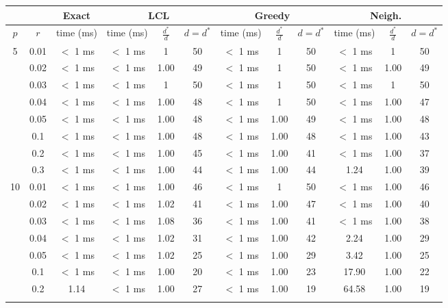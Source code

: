 \begin{tabular}{| c | c | c | c | c | c | c | c | c |  c | c | c | }
	\hline
	& & Exact & \multicolumn{3}{c|}{LCL} & \multicolumn{3}{c|}{Greedy} & \multicolumn{3}{c|}{Neigh.} \\
	\hline
	$p$ & $r$ & time (ms) & time (ms) & $\frac{d^*}{d}$ & $d = d^*$ & time (ms) &  $\frac{d^*}{d}$ & $d = d^*$ & time (ms) &  $\frac{d^*}{d}$ & $d = d^*$ \\
	\hline
	\multirow{8}{*}{5} & 0.01 & $<$ 1 ms & $<$ 1 ms & 1 & 50 & $<$ 1 ms & 1 & 50 & $<$ 1 ms & 1 & 50\\
	\cline{2-12}
	& 0.02 & $<$ 1 ms & $<$ 1 ms & 1.00 & 49 & $<$ 1 ms & 1 & 50 & $<$ 1 ms & 1.00 & 49\\
	\cline{2-12}
	& 0.03 & $<$ 1 ms & $<$ 1 ms & 1 & 50 & $<$ 1 ms & 1 & 50 & $<$ 1 ms & 1 & 50\\
	\cline{2-12}
	& 0.04 & $<$ 1 ms & $<$ 1 ms & 1.00 & 48 & $<$ 1 ms & 1 & 50 & $<$ 1 ms & 1.00 & 47\\
	\cline{2-12}
	& 0.05 & $<$ 1 ms & $<$ 1 ms & 1.00 & 48 & $<$ 1 ms & 1.00 & 49 & $<$ 1 ms & 1.00 & 48\\
	\cline{2-12}
	& 0.1 & $<$ 1 ms & $<$ 1 ms & 1.00 & 48 & $<$ 1 ms & 1.00 & 48 & $<$ 1 ms & 1.00 & 43\\
	\cline{2-12}
	& 0.2 & $<$ 1 ms & $<$ 1 ms & 1.00 & 45 & $<$ 1 ms & 1.00 & 41 & $<$ 1 ms & 1.00 & 37\\
	\cline{2-12}
	& 0.3 & $<$ 1 ms & $<$ 1 ms & 1.00 & 44 & $<$ 1 ms & 1.00 & 44 & 1.24 & 1.00 & 39\\
	\hline
	\multirow{8}{*}{10} & 0.01 & $<$ 1 ms & $<$ 1 ms & 1.00 & 46 & $<$ 1 ms & 1 & 50 & $<$ 1 ms & 1.00 & 46\\
	\cline{2-12}
	& 0.02 & $<$ 1 ms & $<$ 1 ms & 1.02 & 41 & $<$ 1 ms & 1.00 & 47 & $<$ 1 ms & 1.00 & 40\\
	\cline{2-12}
	& 0.03 & $<$ 1 ms & $<$ 1 ms & 1.08 & 36 & $<$ 1 ms & 1.00 & 41 & $<$ 1 ms & 1.00 & 38\\
	\cline{2-12}
	& 0.04 & $<$ 1 ms & $<$ 1 ms & 1.02 & 31 & $<$ 1 ms & 1.00 & 42 & 2.24 & 1.00 & 29\\
	\cline{2-12}
	& 0.05 & $<$ 1 ms & $<$ 1 ms & 1.02 & 25 & $<$ 1 ms & 1.00 & 29 & 3.42 & 1.00 & 25\\
	\cline{2-12}
	& 0.1 & $<$ 1 ms & $<$ 1 ms & 1.00 & 20 & $<$ 1 ms & 1.00 & 23 & 17.90 & 1.00 & 22\\
	\cline{2-12}
	& 0.2 & 1.14 & $<$ 1 ms & 1.00 & 27 & $<$ 1 ms & 1.00 & 19 & 64.58 & 1.00 & 19\\
	\cline{2-12}

\end{tabular}
